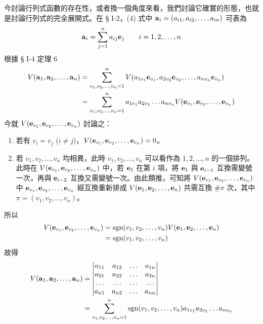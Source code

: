 今討論行列式函數的存在性，或者換一個角度來看，我們討論它確實的形態，也就是討論行列式的完全展開式。在 § I-2，(4) 式中 $\boldsymbol{\mathbf{a}}_i=(a_{i1}, a_{i2}, \dots, a_{in})$ 可表為
\begin{equation}
\boldsymbol{\mathbf{a}}_i = \sum_{j=1}^n a_{ij} \boldsymbol{\mathbf{e}}_j \qquad i=1, 2, \dots, n \label{eq:b6-1-5-1}
\end{equation}
根據 § I-4 定理 6
\begin{align}
V(\boldsymbol{\mathbf{a}}_1, \boldsymbol{\mathbf{a}}_2, \dots, \boldsymbol{\mathbf{a}}_n) &= \sum_{v_1, v_2, \dots, v_n=1}^n V(a_{1v_1} \boldsymbol{\mathbf{e}}_{v_1}, a_{2v_2} \boldsymbol{\mathbf{e}}_{v_2}, \dots, a_{nv_n} \boldsymbol{\mathbf{e}}_{v_n}) \notag \\
&= \sum_{v_1, v_2, \dots, v_n=1}^n a_{1v_1} a_{2v_2} \dots a_{nv_n} V(\boldsymbol{\mathbf{e}}_{v_1}, \boldsymbol{\mathbf{e}}_{v_2}, \dots, \boldsymbol{\mathbf{e}}_{v_n}) \label{eq:b6-1-5-2}
\end{align}
今就 $V(\boldsymbol{\mathbf{e}}_{v_1}, \boldsymbol{\mathbf{e}}_{v_2}, \dots, \boldsymbol{\mathbf{e}}_{v_n})$ 討論之：
\begin{enumerate}[label=(\arabic*), leftmargin=2em]
  \item 若有 $v_i = v_j$ ($i \ne j$)，$V(\boldsymbol{\mathbf{e}}_{v_1}, \boldsymbol{\mathbf{e}}_{v_2}, \dots, \boldsymbol{\mathbf{e}}_{v_n}) = 0$。
  \item 若 $v_1, v_2, \dots, v_n$ 均相異，此時 $v_1, v_2, \dots, v_n$ 可以看作為 $1, 2, \dots, n$ 的一個排列。此時在 $V(\boldsymbol{\mathbf{e}}_{v_1}, \boldsymbol{\mathbf{e}}_{v_2}, \dots, \boldsymbol{\mathbf{e}}_{v_n})$ 中，若 $\boldsymbol{\mathbf{e}}_1$ 在第 $i$ 項，將 $\boldsymbol{\mathbf{e}}_1$ 與 $\boldsymbol{\mathbf{e}}_{i-1}$ 互換需變號一次，再與 $\boldsymbol{\mathbf{e}}_{i-2}$ 互換又需變號一次。由此類推，可知將 $V(\boldsymbol{\mathbf{e}}_{v_1}, \boldsymbol{\mathbf{e}}_{v_2}, \dots, \boldsymbol{\mathbf{e}}_{v_n})$ 中 $\boldsymbol{\mathbf{e}}_{v_1}, \boldsymbol{\mathbf{e}}_{v_2}, \dots, \boldsymbol{\mathbf{e}}_{v_n}$ 經互換重新排成 $V(\boldsymbol{\mathbf{e}}_1, \boldsymbol{\mathbf{e}}_2, \dots, \boldsymbol{\mathbf{e}}_n)$ 共需互換 $\#\pi$ 次，其中 $\pi=(v_1, v_2, \dots, v_n)$。
\end{enumerate}
所以
\begin{align}
V(\boldsymbol{\mathbf{e}}_{v_1}, \boldsymbol{\mathbf{e}}_{v_2}, \dots, \boldsymbol{\mathbf{e}}_{v_n}) &= \operatorname{sgn}(v_1, v_2, \dots, v_n) V(\boldsymbol{\mathbf{e}}_1, \boldsymbol{\mathbf{e}}_2, \dots, \boldsymbol{\mathbf{e}}_n) \notag \\
&= \operatorname{sgn}(v_1, v_2, \dots, v_n) \label{eq:b6-1-5-3}
\end{align}
故得
\begin{align}
V(\boldsymbol{\mathbf{a}}_1, \boldsymbol{\mathbf{a}}_2, \dots, \boldsymbol{\mathbf{a}}_n) &= \begin{vmatrix}
a_{11} & a_{12} & \dots & a_{1n} \\
a_{21} & a_{22} & \dots & a_{2n} \\
\dots & \dots & \dots & \dots \\
a_{n1} & a_{n2} & \dots & a_{nn}
\end{vmatrix} \notag \\
&= \sum_{v_1, v_2, \dots, v_n=1}^n \operatorname{sgn}(v_1, v_2, \dots, v_n) a_{1v_1} a_{2v_2} \dots a_{nv_n} \label{eq:b6-1-5-4}
\end{align}

